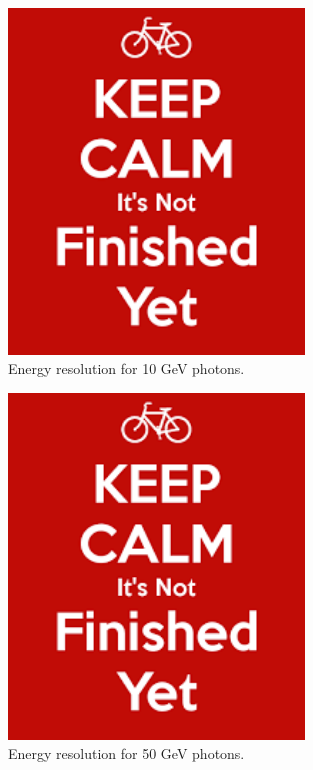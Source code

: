 \begin{figure}
  \centering
  \includegraphics[width=0.7\textwidth,keepaspectratio]{DECALStudies/fig/dummy}
  \caption{Energy resolution for 10 GeV photons.}
  \label{fig:resolution10}
\end{figure}

\begin{figure}
  \centering
  \includegraphics[width=0.7\textwidth,keepaspectratio]{DECALStudies/fig/dummy}
  \caption{Energy resolution for 50 GeV photons.}
  \label{fig:resolution50}
\end{figure}

